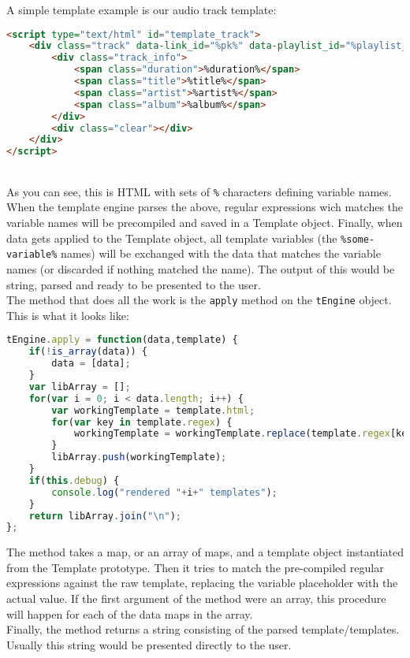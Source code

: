 A simple template example is our audio track template:
\begin{lstlisting}[language=HTML,caption=The template used to represent audio tracks]
<script type="text/html" id="template_track">
	<div class="track" data-link_id="%pk%" data-playlist_id="%playlist_id%" data-path="%path%">
		<div class="track_info">
			<span class="duration">%duration%</span>
			<span class="title">%title%</span>
			<span class="artist">%artist%</span>
			<span class="album">%album%</span>
		</div>
		<div class="clear"></div>
	</div>
</script>
\end{lstlisting}
\\
As you can see, this is HTML with sets of \verb$%$ characters defining variable names. When the template engine parses the above, regular expressions wich matches the variable names will be precompiled and saved in a Template object. Finally, when data gets applied to the Template object, all template variables (the \verb$%some-variable%$ names) will be exchanged with the data that matches the variable names (or discarded if nothing matched the name).
The output of this would be string, parsed and ready to be presented to the user.
\\
The method that does all the work is the \verb$apply$ method on the \verb$tEngine$ object. This is what it looks like:
\begin{lstlisting}[language=JavaScript,caption=The javascript engine apply method]
tEngine.apply = function(data,template) {
    if(!is_array(data)) {
        data = [data];
    }
    var libArray = [];
    for(var i = 0; i < data.length; i++) {
        var workingTemplate = template.html;
        for(var key in template.regex) {
            workingTemplate = workingTemplate.replace(template.regex[key],data[i][key]);
        }
        libArray.push(workingTemplate);
    }
	if(this.debug) {
		console.log("rendered "+i+" templates");
	}
    return libArray.join("\n");
};
\end{lstlisting}
The method takes a map, or an array of maps, and a template object instantiated from the Template prototype.
Then it tries to match the pre-compiled regular expressions against the raw template, replacing the variable placeholder with the actual value. If the first argument of the method were an array, this procedure will happen for each of the data maps in the array.
\\
Finally, the method returns a string consisting of the parsed template/templates. Usually this string would be presented directly to the user.
